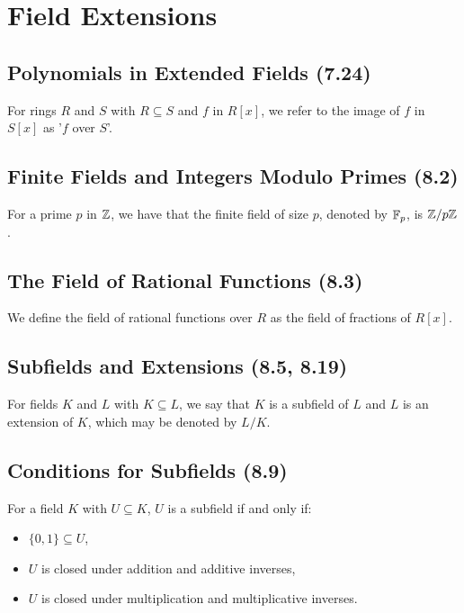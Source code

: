\section{Field Extensions}

\subsection{Polynomials in Extended Fields (7.24)} \label{7.24}

For rings $R$ and $S$ with $R \subseteq S$ and $f$ in $R[x]$, we refer
to the image of $f$ in $S[x]$ as '$f$ over $S$'.

\subsection{Finite Fields and Integers Modulo Primes (8.2)} \label{8.2}

For a prime $p$ in $\mathbb{Z}$, we have that the finite field of
size $p$, denoted by $\mathbb{F}_p$, is $\mathbb{Z}/p\mathbb{Z}$.

\subsection{The Field of Rational Functions (8.3)} \label{8.3}

We define the field of rational functions over $R$ as the field of
fractions of $R[x]$.

\subsection{Subfields and Extensions (8.5, 8.19)} \label{8.5} \label{8.19}

For fields $K$ and $L$ with $K \subseteq L$, we say that $K$ is a
subfield of $L$ and $L$ is an extension of $K$, which may be
denoted by $L / K$.

\subsection{Conditions for Subfields (8.9)} \label{8.9}

For a field $K$ with $U \subseteq K$, $U$ is a subfield if and only if: 
\begin{itemize}
    \item $\{0, 1\} \subseteq U$,
    \item $U$ is closed under addition and additive inverses,
    \item $U$ is closed under multiplication and multiplicative inverses. 
\end{itemize}

